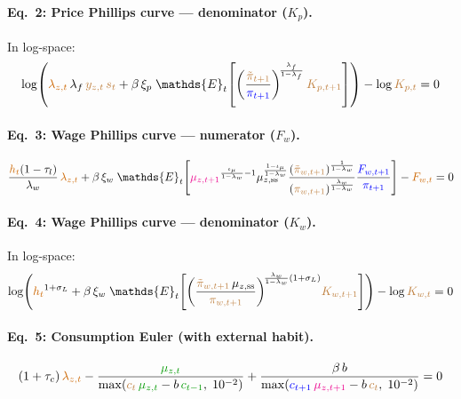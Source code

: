 \documentclass[11pt]{article}
\begin{document}
\paragraph{Eq.~2: Price Phillips curve --- denominator ($K_p$).}
In log-space:
\begin{equation}
  \log\!\left(
    \textcolor{orange!80!black}{\lambda_{z,t}}\,\lambda_f\,\textcolor{brown}{y_{z,t}}\,\textcolor{brown}{s_t}
    + \beta\,\xi_p\;\mathds{E}_t\!\left[
      \left(\frac{\textcolor{brown}{\tilde\pi_{t+1}}}{\textcolor{blue}{\pi_{t+1}}}\right)^{\!\frac{\lambda_f}{1-\lambda_f}}
      \textcolor{brown}{K_{p,t+1}}
    \right]
  \right)
  - \log\textcolor{brown}{K_{p,t}} = 0
\end{equation}

\paragraph{Eq.~3: Wage Phillips curve --- numerator ($F_w$).}
\begin{equation}
  \frac{\textcolor{orange!80!black}{h_t}(1-\tau_l)}{\lambda_w}\,\textcolor{orange!80!black}{\lambda_{z,t}}
  + \beta\,\xi_w\;\mathds{E}_t\!\left[
    \textcolor{magenta}{\mu_{z,t+1}}^{\frac{\iota_\mu}{1-\lambda_w}-1}
    \mu_{z,\text{ss}}^{\frac{1-\iota_\mu}{1-\lambda_w}}
    \frac{(\textcolor{brown}{\tilde\pi_{w,t+1}})^{\frac{1}{1-\lambda_w}}}
         {(\textcolor{brown}{\pi_{w,t+1}})^{\frac{\lambda_w}{1-\lambda_w}}}
    \frac{\textcolor{blue}{F_{w,t+1}}}{\textcolor{blue}{\pi_{t+1}}}
  \right]
  - \textcolor{orange!80!black}{F_{w,t}} = 0
\end{equation}

\paragraph{Eq.~4: Wage Phillips curve --- denominator ($K_w$).}
In log-space:
\begin{equation}
  \log\!\left(
    \textcolor{orange!80!black}{h_t}^{1+\sigma_L}
    + \beta\,\xi_w\;\mathds{E}_t\!\left[
      \left(\frac{\textcolor{brown}{\tilde\pi_{w,t+1}}\,\mu_{z,\text{ss}}}
           {\textcolor{brown}{\pi_{w,t+1}}}\right)^{\!\frac{\lambda_w}{1-\lambda_w}(1+\sigma_L)}
      \!\textcolor{brown}{K_{w,t+1}}
    \right]
  \right)
  - \log\textcolor{brown}{K_{w,t}} = 0
\end{equation}

\paragraph{Eq.~5: Consumption Euler (with external habit).}
\begin{equation}
  (1+\tau_c)\,\textcolor{orange!80!black}{\lambda_{z,t}}
  - \frac{\textcolor{green!60!black}{\mu_{z,t}}}
    {\max(\textcolor{brown}{c_t}\,\textcolor{green!60!black}{\mu_{z,t}} - b\,\textcolor{green!60!black}{c_{t-1}},\; 10^{-2})}
  + \frac{\beta\,b}
    {\max(\textcolor{blue}{c_{t+1}}\,\textcolor{magenta}{\mu_{z,t+1}} - b\,\textcolor{brown}{c_t},\; 10^{-2})}
  = 0
\end{equation}
\end{document}

